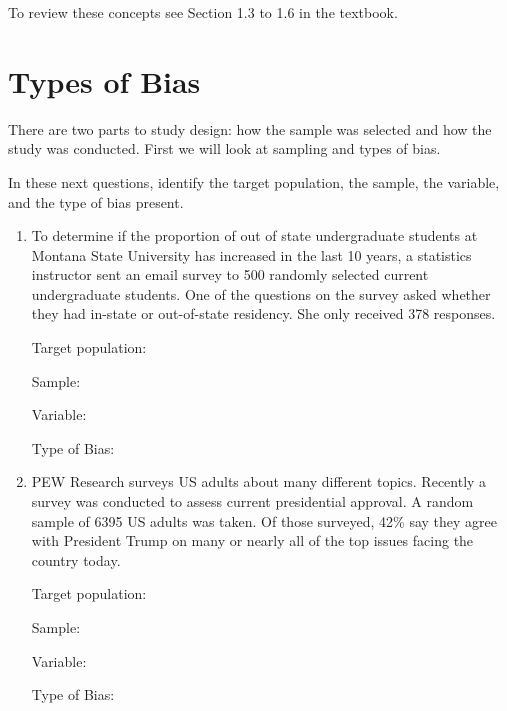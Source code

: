 \documentclass[
]{report}
\begin{document}
To review these concepts see Section 1.3 to 1.6 in the textbook.

\newpage

\hypertarget{types-of-bias}{%
\section{Types of Bias}\label{types-of-bias}}

There are two parts to study design: how the sample was selected and how the study was conducted. First we will look at sampling and types of bias.

In these next questions, identify the target population, the sample, the variable, and the type of bias present.

\begin{enumerate}
\def\labelenumi{\arabic{enumi}.}
\item
  To determine if the proportion of out of state undergraduate students at Montana State University has increased in the last 10 years, a statistics instructor sent an email survey to 500 randomly selected current undergraduate students. One of the questions on the survey asked whether they had in-state or out-of-state residency. She only received 378 responses.
  \vspace{0.25in}

  Target population:
  \vspace{0.3in}

  Sample:
  \vspace{0.3in}

  Variable:
  \vspace{0.3in}

  Type of Bias:
  \vspace{0.3in}
\item
  PEW Research surveys US adults about many different topics. Recently a survey was conducted to assess current presidential approval. A random sample of 6395 US adults was taken. Of those surveyed, 42\% say they agree with President Trump on many or nearly all of the top issues facing the country today.
  \vspace{0.25in}

  Target population:
  \vspace{0.3in}

  Sample:
  \vspace{0.3in}

  Variable:
  \vspace{0.3in}

  Type of Bias:
  \vspace{0.3in}
\end{enumerate}
\end{document}
